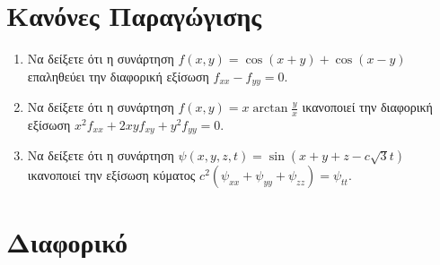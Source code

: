 


\pagestyle{askhseis}

\renewcommand{\vec}{\mathbf}



\begin{center}
  \minibox{\large \bfseries \textcolor{Col1}{Μερική Παράγωγος - Διαφορικό}}
\end{center}

\vspace{\baselineskip}

\section*{Κανόνες Παραγώγισης}

\begin{enumerate}
  \item Να δείξετε ότι η συνάρτηση $ f(x,y) = \cos{(x+y)} + \cos{(x-y)} $ 
    επαληθεύει την διαφορική εξίσωση $ f_{xx} - f_{yy} = 0 $.

  \item Να δείξετε ότι η συνάρτηση $ f(x,y) = x \arctan{\frac{y}{x}} $ 
    ικανοποιεί την διαφορική εξίσωση $ x^{2} f_{xx} + 2xyf_{xy} + y^{2} f_{yy} = 0 $. 

  \item Να δείξετε ότι η συνάρτηση $ \psi(x,y,z,t) = \sin{(x+y+z- c \sqrt{3}t)} $ 
    ικανοποιεί την εξίσωση κύματος $ c^{2}(\psi _{xx}+ \psi _{yy} + \psi _{zz}) = \psi
    _{tt} $.

\end{enumerate}


\section*{Διαφορικό}

